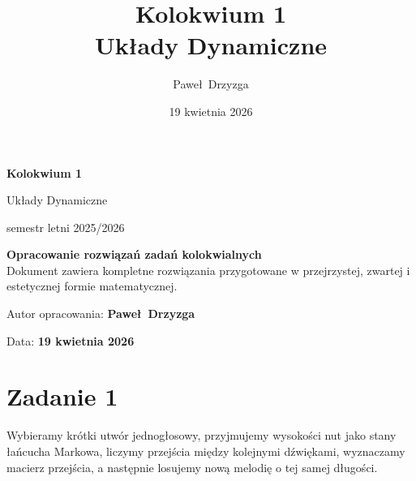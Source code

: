 \documentclass[11pt,a4paper]{article}
\title{\vspace{-1.5cm}\Huge\bfseries Kolokwium 1\\[0.4em]\Large Uk\l ady Dynamiczne}
\author{\large Pawe\l\ Drzyzga}
\date{19 kwietnia 2026}
\theoremstyle{plain}
\theoremstyle{definition}
\begin{document}
\raggedbottom

\begin{titlepage}
    \centering
    \vspace*{2.5cm}
    {\Huge\bfseries\color{accent} Kolokwium 1\par}
    \vspace{0.4cm}
    {\LARGE Uk\l ady Dynamiczne\par}
    \vspace{1.2cm}
    {\large semestr letni 2025/2026\par}
    \vspace{2.2cm}
    \begin{tcolorbox}[width=0.82\textwidth,colback=accentsoft,colframe=accentline]
        \centering
        {\large\textbf{Opracowanie rozwi\k{a}za\'n zada\'n kolokwialnych}}\\[0.4em]
        \small
        Dokument zawiera kompletne rozwi\k{a}zania przygotowane w przejrzystej,
        zwartej i estetycznej formie matematycznej.
    \end{tcolorbox}
    \vfill
    {\large Autor opracowania: \textbf{Pawe\l\ Drzyzga}\par}
    \vspace{0.3cm}
    {\large Data: \textbf{19 kwietnia 2026}\par}
    \vspace{1.5cm}
\end{titlepage}

\clearpage
{}
\tableofcontents
\vspace{0.7cm}

\section{Zadanie 1}

\begin{opisbox}
Wybieramy kr\'otki utw\'or jednog\l osowy, przyjmujemy wysoko\'sci nut jako stany \l a\'ncucha Markowa,
liczymy przej\'scia mi\k{e}dzy kolejnymi d\'zwi\k{e}kami, wyznaczamy macierz przej\'scia, a nast\k{e}pnie
losujemy now\k{a} melodi\k{e} o tej samej d\l ugo\'sci.
\end{opisbox}
\end{document}
